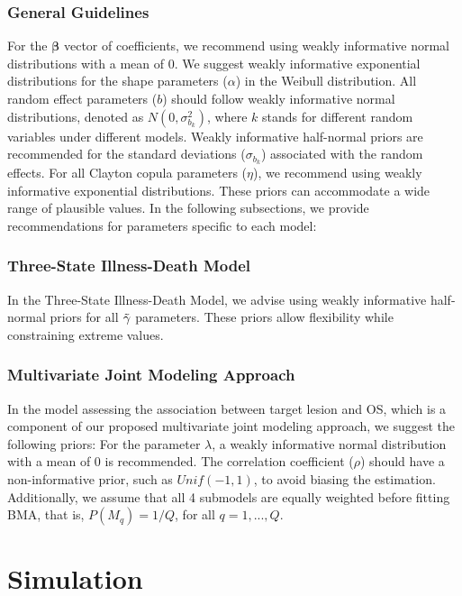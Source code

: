 \subsubsection{General Guidelines}

For the $\boldsymbol{\beta}$ vector of coefficients, we recommend using weakly informative normal distributions with a mean of 0. We suggest weakly informative exponential distributions for the shape parameters ($\alpha$) in the Weibull distribution. All random effect parameters ($b$) should follow weakly informative normal distributions, denoted as $N(0, \sigma_{b_k}^2)$, where $k$ stands for different random variables under different models. Weakly informative half-normal priors are recommended for the standard deviations ($\sigma_{b_k}$) associated with the random effects. For all Clayton copula parameters ($\eta$), we recommend using weakly informative exponential distributions. These priors can accommodate a wide range of plausible values. In the following subsections, we provide recommendations for parameters specific to each model:

\subsubsection{Three-State Illness-Death Model}

In the Three-State Illness-Death Model, we advise using weakly informative half-normal priors for all $\Tilde{\gamma}$ parameters. These priors allow flexibility while constraining extreme values.

\subsubsection{Multivariate Joint Modeling Approach}

In the model assessing the association between target lesion and OS, which is a component of our proposed multivariate joint modeling approach, we suggest the following priors: For the parameter $\lambda$, a weakly informative normal distribution with a mean of 0 is recommended. The correlation coefficient ($\rho$) should have a non-informative prior, such as $Unif(-1, 1)$, to avoid biasing the estimation. Additionally, we assume that all 4 submodels are equally weighted before fitting BMA, that is, $P(M_q) = 1/Q$, for all $q = 1,...,Q$.


\section{Simulation}
\label{sec:simulation}

